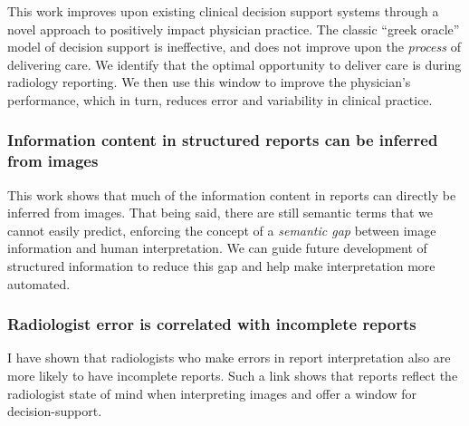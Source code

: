 This work improves upon existing clinical decision support systems through a novel approach to positively impact physician practice. The classic ``greek oracle'' model of decision support is ineffective, and does not improve upon the \emph{process} of delivering care. We identify that the optimal opportunity to deliver care is during radiology reporting. We then use this window to improve the physician's performance, which in turn, reduces error and variability in clinical practice.

\subsubsection{Information content in structured reports can be inferred from images}
This work shows that much of the information content in reports can directly be inferred from images. That being said, there are still semantic terms that we cannot easily predict, enforcing the concept of a \emph{semantic gap} between image information and human interpretation. We can guide future development of structured information to reduce this gap and help make interpretation more automated.

\subsubsection{Radiologist error is correlated with incomplete reports}
I have shown that radiologists who make errors in report interpretation also are more likely to have incomplete reports. Such a link shows that reports reflect the radiologist state of mind when interpreting images and offer a window for decision-support.

